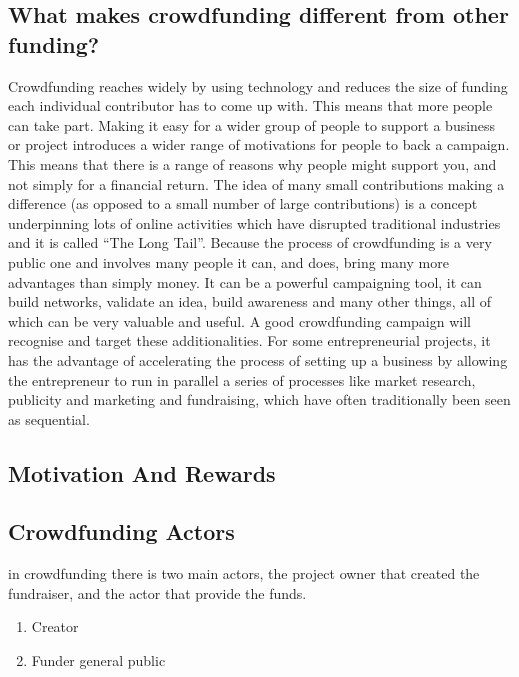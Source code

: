 \subsection*{ What makes crowdfunding different from other funding? }
Crowdfunding reaches widely by using technology and reduces the size of funding each
individual contributor has to come up with. This means that more people can take part.
Making it easy for a wider group of people to support a business or project introduces
a wider range of motivations for people to back a campaign. This means that there is a
range of reasons why people might support you, and not simply for a financial return.
The idea of many small contributions making a difference (as opposed to a small
number of large contributions) is a concept underpinning lots of online activities which
have disrupted traditional industries and it is called “The Long Tail”.
Because the process of crowdfunding is a very public one and involves many people it
can, and does, bring many more advantages than simply money. It can be a powerful
campaigning tool, it can build networks, validate an idea, build awareness and many
other things, all of which can be very valuable and useful. A good crowdfunding
campaign will recognise and target these additionalities.
For some entrepreneurial projects, it has the advantage of accelerating the process
of setting up a business by allowing the entrepreneur to run in parallel a series of
processes like market research, publicity and marketing and fundraising, which have
often traditionally been seen as sequential.



\subsection*{ Motivation And Rewards }



\subsection*{ Crowdfunding Actors }
in crowdfunding there is two main actors, the project owner that created the fundraiser, and the actor that provide the funds.
\begin{enumerate}
    \item Creator
    \item Funder general public
\end{enumerate}

